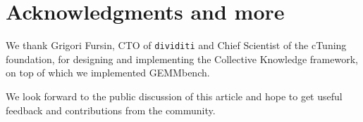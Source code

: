 \documentclass{acm_proc_article-sp} %
\begin{document}
\section*{Acknowledgments and more}

We thank Grigori Fursin, CTO of {\tt dividiti} and Chief Scientist of the
cTuning foundation, for designing and implementing the Collective
Knowledge framework, on top of which we implemented GEMMbench.

We look forward to the public discussion of this article and hope to get
useful feedback and contributions from the community.





\balancecolumns
\end{document}

